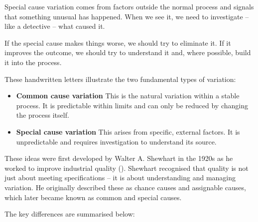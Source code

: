 \documentclass[
]{book}
\begin{document}
Special cause variation comes from factors outside the normal process and signals that something unusual has happened. When we see it, we need to investigate -- like a detective -- what caused it.

If the special cause makes things worse, we should try to eliminate it. If it improves the outcome, we should try to understand it and, where possible, build it into the process.

These handwritten letters illustrate the two fundamental types of variation:

\begin{itemize}
\item
  \textbf{Common cause variation}
  This is the natural variation within a stable process. It is predictable within limits and can only be reduced by changing the process itself.
\item
  \textbf{Special cause variation}
  This arises from specific, external factors. It is unpredictable and requires investigation to understand its source.
\end{itemize}

These ideas were first developed by Walter A. Shewhart in the 1920s as he worked to improve industrial quality (). Shewhart recognised that quality is not just about meeting specifications -- it is about understanding and managing variation. He originally described these as chance causes and assignable causes, which later became known as common and special causes.

The key differences are summarised below:
\end{document}
